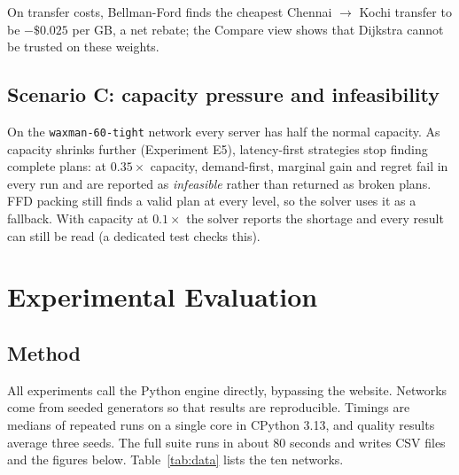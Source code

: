 \noindent On transfer costs, Bellman-Ford finds the cheapest Chennai $\to$ Kochi transfer to be $-\$0.025$ per GB, a net rebate; the Compare view shows that Dijkstra cannot be trusted on these weights.

\subsection{Scenario C: capacity pressure and infeasibility}
On the \texttt{waxman-60-tight} network every server has half the normal capacity. As capacity shrinks further (Experiment E5), latency-first strategies stop finding complete plans: at $0.35\times$ capacity, demand-first, marginal gain and regret fail in every run and are reported as \emph{infeasible} rather than returned as broken plans. FFD packing still finds a valid plan at every level, so the solver uses it as a fallback. With capacity at $0.1\times$ the solver reports the shortage and every result can still be read (a dedicated test checks this).

\section{Experimental Evaluation}\label{sec:exp}

\subsection{Method}
All experiments call the Python engine directly, bypassing the website. Networks come from seeded generators so that results are reproducible. Timings are medians of repeated runs on a single core in CPython 3.13, and quality results average three seeds. The full suite runs in about 80 seconds and writes CSV files and the figures below. Table~\ref{tab:data} lists the ten networks.

